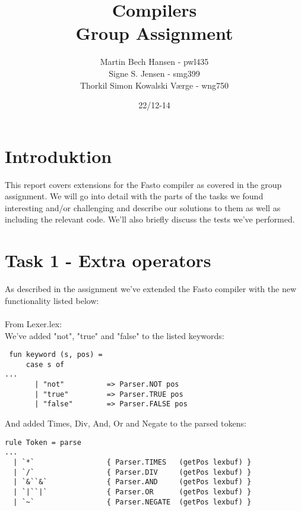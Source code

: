 \documentclass{article}
\begin{document}

\title{Compilers\\Group Assignment}
\author{Martin Bech Hansen - pwl435\\Signe S. Jensen - smg399\\Thorkil Simon Kowalski Værge - wng750}

\date{22/12-14}

\maketitle
\newpage

\tableofcontents

\newpage

\section{Introduktion}
This report covers extensions for the Fasto compiler as covered in the group assignment. We will go into detail with the parts of the tasks we found interesting and/or challenging and describe our solutions to them as well as including the relevant code. We'll also briefly discuss the tests we've performed.

\section{Task 1 - Extra operators}

As described in the assignment we've extended the Fasto compiler with the new functionality listed below:\\
\\
From Lexer.lex:\\
We've added "not", "true" and "false" to the listed keywords:
\begin{lstlisting}
 fun keyword (s, pos) =
     case s of
...
       | "not"          => Parser.NOT pos
       | "true"         => Parser.TRUE pos
       | "false"        => Parser.FALSE pos       
\end{lstlisting}
\noindent And added Times, Div, And, Or and Negate to the parsed tokens:
\begin{lstlisting}
rule Token = parse
...
  | `*`                 { Parser.TIMES   (getPos lexbuf) }
  | `/`                 { Parser.DIV     (getPos lexbuf) }
  | `&``&`              { Parser.AND     (getPos lexbuf) }
  | `|``|`              { Parser.OR      (getPos lexbuf) }
  | `~`                 { Parser.NEGATE  (getPos lexbuf) }
\end{lstlisting}
\end{document}
